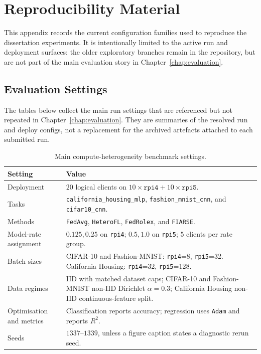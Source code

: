 \chapter{Reproducibility Material}
\label{appendix:reproducibility_material}

This appendix records the current configuration families used to reproduce the dissertation experiments. It is intentionally limited to the active run and deployment surfaces: the older exploratory branches remain in the repository, but are not part of the main evaluation story in Chapter~\ref{chap:evaluation}.

\section{Evaluation Settings}
\label{appendix:evaluation_settings}

The tables below collect the main run settings that are referenced but not repeated in Chapter~\ref{chap:evaluation}. They are summaries of the resolved run and deploy configs, not a replacement for the archived artefacts attached to each submitted run.

\begin{table}[!htbp]
\centering
\caption{Main compute-heterogeneity benchmark settings.}
\label{tab:appendix_compute_settings}
\footnotesize
\begin{tabularx}{\textwidth}{>{\raggedright\arraybackslash}p{}X}
\toprule
Setting & Value \\
\midrule
Deployment & \(20\) logical clients on \(10\times\texttt{rpi4}+10\times\texttt{rpi5}\). \\
Tasks & \texttt{california\_housing\_mlp}, \texttt{fashion\_mnist\_cnn}, and \texttt{cifar10\_cnn}. \\
Methods & \texttt{FedAvg}, \texttt{HeteroFL}, \texttt{FedRolex}, and \texttt{FIARSE}. \\
Model-rate assignment & \(0.125,0.25\) on \texttt{rpi4}; \(0.5,1.0\) on \texttt{rpi5}; \(5\) clients per rate group. \\
Batch sizes & CIFAR-10 and Fashion-MNIST: \texttt{rpi4}=8, \texttt{rpi5}=32. California Housing: \texttt{rpi4}=32, \texttt{rpi5}=128. \\
Data regimes & IID with matched dataset caps; CIFAR-10 and Fashion-MNIST non-IID Dirichlet \(\alpha=0.3\); California Housing non-IID continuous-feature split. \\
Optimisation and metrics & Classification reports accuracy; regression uses \texttt{Adam} and reports \(R^2\). \\
Seeds & \(1337\)--\(1339\), unless a figure caption states a diagnostic rerun seed. \\
\bottomrule
\end{tabularx}
\end{table}

